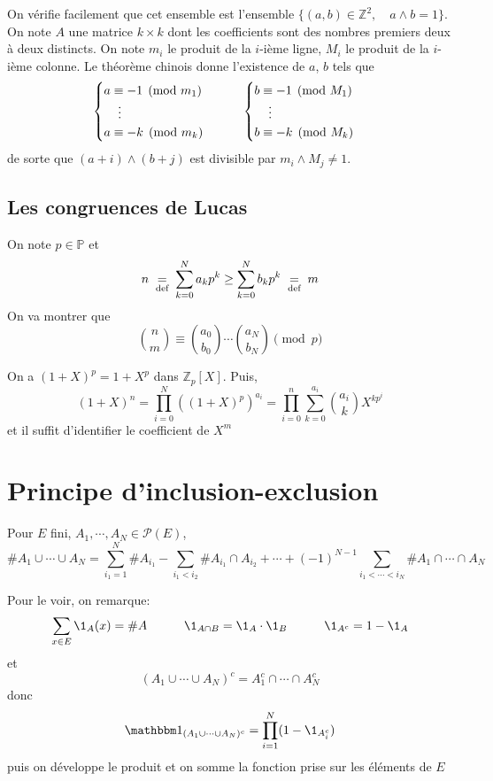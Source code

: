 On vérifie facilement que cet ensemble est l'ensemble $\{(a, b)\in\mathbb Z^2, \quad a\land b=1\}$. On note $A$ une matrice $k\times k$ dont les coefficients sont des nombres premiers deux à deux distincts. On note $m_i$ le produit de la $i$-ième ligne, $M_i$ le produit de la $i$-ième colonne. Le théorème chinois donne l'existence de $a$, $b$ tels que \[
    \begin{cases}
        a\equiv -1\pmod {m_1} \\
        \hspace{.4cm}\vdots \\
        a\equiv -k\pmod{m_k}
    \end{cases}
    \qquad \begin{cases}
        b\equiv -1\pmod {M_1}\\
        \hspace{.4cm}\vdots \\
        b\equiv -k\pmod{M_k}
    \end{cases}
\]
de sorte que $(a+i)\land (b+j)$ est divisible par $m_i\land M_j\neq 1$.

\subsection{Les congruences de Lucas}

On note $p\in\mathbb P$ et \[
    n\;\underset{\text{def}}=\;\sum_{k=0}^Na_kp^k\geq \sum_{k=0}^Nb_kp^k\;\underset{\text{def}}=\; m
\]
On va montrer que \[
    \binom nm\equiv \binom{a_0}{b_0}\cdots \binom{a_N}{b_N}\pmod p
\]

On a $(1+X)^p=1+X^p$ dans $\mathbb Z_p[X]$. Puis, \[
    (1+X)^n=\prod_{i=0}^N((1+X)^p)^{a_i}=\prod_{i=0}^n\sum_{k=0}^{a_i}\binom{a_i}{k}X^{kp^i}
\]
et il suffit d'identifier le coefficient de $X^m$

\section{Principe d'inclusion-exclusion}

Pour $E$ fini, $A_1, \cdots, A_N\in\mathcal P(E)$, \[
    \#A_1\cup\cdots \cup A_N=\sum_{i_1=1}^N\#A_{i_1}-\sum_{i_1<i_2}\#A_{i_1}\cap A_{i_2}+\cdots +(-1)^{N-1}\sum_{i_1<\cdots <i_N}\#A_1\cap \cdots \cap A_N
\]

Pour le voir, on remarque: \[
    \sum_{x\in E}\1_{A}(x)=\#A \qquad\quad \1_{A\cap B}=\1_A \cdot \1_B \qquad \quad \1_{A^c}=1-\1_A
\]
et \[
    (A_1\cup \cdots \cup A_N)^c=A_1^c\cap \cdots \cap A_N^c
\]
donc \[
    \mathbbm1_{(A_1\cup \cdots \cup A_N)^c}=\prod_{i=1}^N(1-\1_{A_i^c})
\]
puis on développe le produit et on somme la fonction prise sur les éléments de $E$



